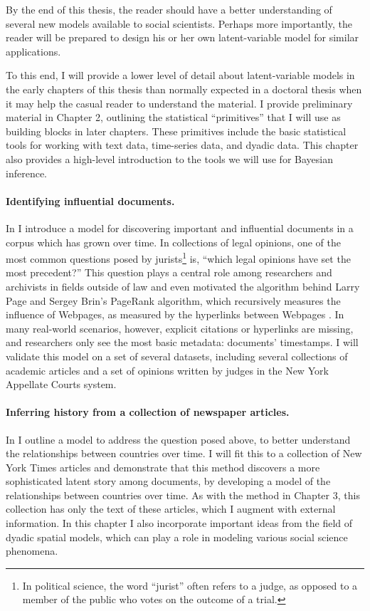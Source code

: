 By the end of this thesis, the reader should have a better
understanding of several new models available to social scientists.
Perhaps more importantly, the reader will be prepared to design his or
her own latent-variable model for similar applications.

To this end, I will provide a lower level of detail about
latent-variable models in the early chapters of this thesis than
normally expected in a doctoral thesis when it may help the casual
reader to understand the material.  I provide preliminary material in
Chapter 2, outlining the statistical ``primitives'' that I will use as
building blocks in later chapters.  These primitives include the basic
statistical tools for working with text data, time-series data, and
dyadic data.  This chapter also provides a high-level introduction to
the tools we will use for Bayesian inference.

\paragraph{Identifying influential documents.} In  I
introduce a model for discovering important and influential documents
in a corpus which has grown over time.  In collections of legal
opinions, one of the most common questions posed by
jurists\footnote{In political science, the word ``jurist'' often
  refers to a judge, as opposed to a member of the public who votes on
  the outcome of a trial.} is, ``which legal opinions have set the
most precedent?''  This question plays a central role among
researchers and archivists in fields outside of law and even motivated
the algorithm behind Larry Page and Sergey Brin's PageRank algorithm,
which recursively measures the influence of Webpages, as measured by
the hyperlinks between Webpages
\citep{garfield:1992,brin:1998,garfield:2002}.  In many real-world
scenarios, however, explicit citations or hyperlinks are missing, and
researchers only see the most basic metadata: documents' timestamps.
I will validate this model on a set of several datasets, including
several collections of academic articles and a set of opinions written
by judges in the New York Appellate Courts system.

\paragraph{Inferring history from a collection of newspaper articles.}
In  I outline a model to address the question
posed above, to better understand the relationships between countries
over time.  I will fit this to a collection of New York Times articles
and demonstrate that this method discovers a more sophisticated latent
story among documents, by developing a model of the relationships
between countries over time.  As with the method in Chapter 3, this
collection has only the text of these articles, which I augment with
external information.  In this chapter I also incorporate important
ideas from the field of dyadic spatial models, which can play a role
in modeling various social science phenomena.


